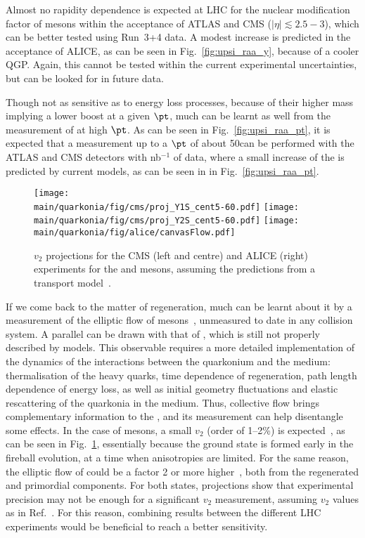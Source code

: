 \documentclass[../report.tex]{subfiles}
\providecommand{\main}{..}
\begin{document}
Almost no rapidity dependence is expected at LHC for the nuclear modification factor of \PGU mesons within the acceptance of ATLAS and CMS ($|\eta|\lesssim 2.5-3$), which can be better
tested using Run~3+4 data. A modest increase is predicted in the acceptance of ALICE, as can be seen in Fig.~\ref{fig:upsi_raa_y}, because of a cooler QGP. Again, this cannot be tested
within the current experimental uncertainties, but can be looked for in future data.

Though not as sensitive as \PJgy to energy loss processes, because of their higher mass implying a lower boost at a given $\pt$, much can be learnt as well from the measurement of
 at high $\pt$. As can be seen in Fig.~\ref{fig:upsi_raa_pt}, it is expected that a measurement up to a $\pt$ of about 50\UGeV can be performed with the ATLAS and CMS detectors with
\unit[10]{nb}$^{-1}$ of data, where a small increase of the \raa is predicted by current models, as can be seen in in Fig.~\ref{fig:upsi_raa_pt}.

\begin{figure}
\begin{center}
 \texttt{[image: \\main/quarkonia/fig/cms/proj\_Y1S\_cent5-60.pdf]}
 \texttt{[image: \\main/quarkonia/fig/cms/proj\_Y2S\_cent5-60.pdf]}
 \texttt{[image: \\main/quarkonia/fig/alice/canvasFlow.pdf]}
\end{center}

 \caption{$v_2$ projections for the CMS (left and centre) and ALICE (right) experiments for the  and  mesons, assuming the predictions from a transport model~\cite{Du:2017qkv}.}
 \label{fig:upsi_v2}
\end{figure}

If we come back to the matter of regeneration, much can be learnt about it by a measurement of the elliptic flow of  mesons~\cite{Das:2018xel}, 
unmeasured to date in any collision system. 
A parallel can be
drawn with that of \PJgy, which is still not properly described by models. This observable requires a more detailed implementation of the dynamics of the interactions between the 
quarkonium and the medium: thermalisation of the heavy quarks, time dependence of regeneration, path length dependence of energy loss, as well as initial geometry fluctuations and 
elastic rescattering of the quarkonia in the medium. Thus, collective flow brings complementary information to the \raa, and its measurement can help disentangle some
effects. In the case of  mesons, a small $v_2$ (order of 1--2\%) is expected~\cite{Du:2017qkv,Yao:2018zrg}, as can be seen in Fig.~\ref{fig:upsi_v2},
essentially because the ground state is formed early in the fireball evolution, at a time when 
anisotropies are limited. For the same reason, the elliptic flow of  could be a factor 2 or more higher~\cite{Du:2017qkv}, both from the regenerated and primordial
components. For both states, projections show that experimental precision may not be enough for a significant $v_2$ measurement, assuming $v_2$ values as in Ref.~\cite{Du:2017qkv}. For this reason,
combining results between the different LHC experiments would be beneficial to reach a better sensitivity.
\end{document}
